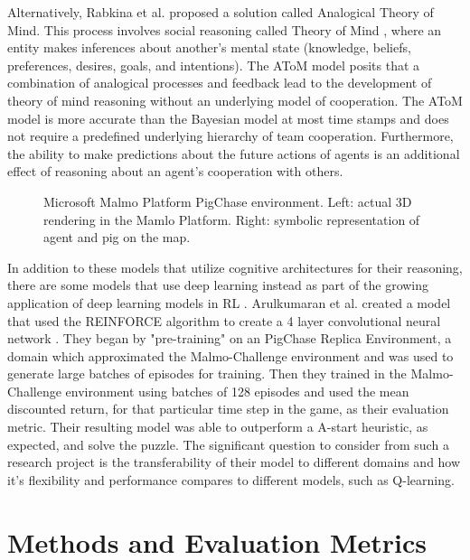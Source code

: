 \documentclass[10pt,twocolumn]{article}
\begin{document}
Alternatively, Rabkina et al. proposed a solution called Analogical Theory of Mind.
This process involves social reasoning called Theory of Mind \cite{Ruhl2020}, where an entity makes inferences about another’s mental state (knowledge, beliefs, preferences, desires, goals, and intentions).
The AToM model posits that a combination of analogical processes and feedback lead to the development of theory of mind reasoning without an underlying model of cooperation.
The AToM model is more accurate than the Bayesian model at most time stamps and does not require a predefined underlying hierarchy of team cooperation.
Furthermore, the ability to make predictions about the future actions of agents is an additional effect of reasoning about an agent’s cooperation with others.

\begin{figure}[ht]
\vspace{0.5cm}
\centering
\caption{Microsoft Malmo Platform PigChase environment. Left: actual 3D rendering in the Mamlo Platform. Right: symbolic representation of agent and pig on the map.}
\label{Figure:2}
\end{figure}

In addition to these models that utilize cognitive architectures for their reasoning, there are some models that use deep learning instead as part of the growing application of deep learning models in RL \cite{Nica2017}.
Arulkumaran et al. created a model that used the REINFORCE algorithm to create a 4 layer convolutional neural network \cite{Arulkumaran2017, Williams1992}.
They began by "pre-training" on an PigChase Replica Environment, a domain which approximated the Malmo-Challenge environment and was used to generate large batches of episodes for training.
Then they trained in the Malmo-Challenge environment using batches of 128 episodes and used the mean discounted return, for that particular time step in the game, as their evaluation metric.
Their resulting model was able to outperform a A-start heuristic, as expected, and solve the puzzle.
The significant question to consider from such a research project is the transferability of their model to different domains and how it's flexibility and performance compares to different models, such as Q-learning.

\section{Methods and Evaluation Metrics}
\end{document}
